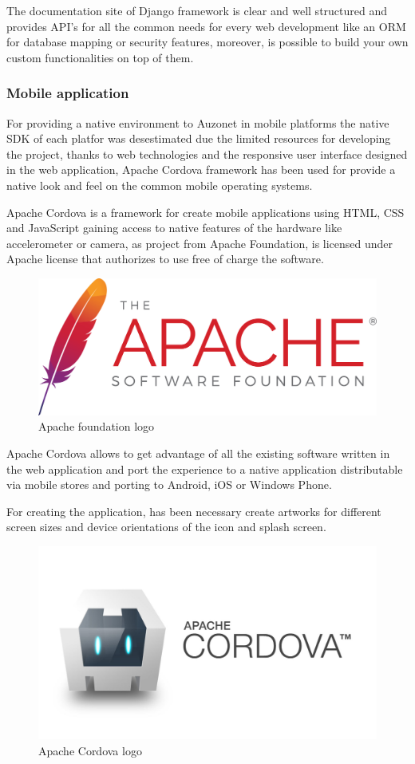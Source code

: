 \documentclass{DeustoFDP}
\begin{document}
The documentation site of Django framework \cite{Djangodocs} is clear and well structured and provides API's for all the common needs for every web development like an ORM for database mapping or security features, moreover, is possible to build your own custom functionalities on top of them.

\subsubsection{Mobile application}
For providing a native environment to Auzonet in mobile platforms the native SDK of each platfor was desestimated due the limited resources for developing the project, thanks to web technologies and the responsive user interface designed in the web application, Apache Cordova framework has been used for provide a native look and feel on the common mobile operating systems.

Apache Cordova is a framework for create mobile applications using HTML, CSS and JavaScript gaining access to native features of the hardware like accelerometer or camera, as project from Apache Foundation, is licensed under Apache license that authorizes to use free of charge the software.

\begin{figure}[h]
\centering
\includegraphics[width=0.4\linewidth]{fig/apache}
\caption[Apache foundation logo]{Apache foundation logo}
\label{fig:apache}
\end{figure}


Apache Cordova \cite{Cordova} allows to get advantage of all the existing software written in the web application and port the experience to a native application distributable via mobile stores and porting to Android, iOS or Windows Phone.

For creating the application, has been necessary create artworks for different screen sizes and device orientations of the icon and splash screen.

\begin{figure}[h]
\centering
\includegraphics[width=0.4\linewidth]{fig/cordova}
\caption[Apache Cordova logo]{Apache Cordova logo}
\label{fig:cordova}
\end{figure}
\end{document}
